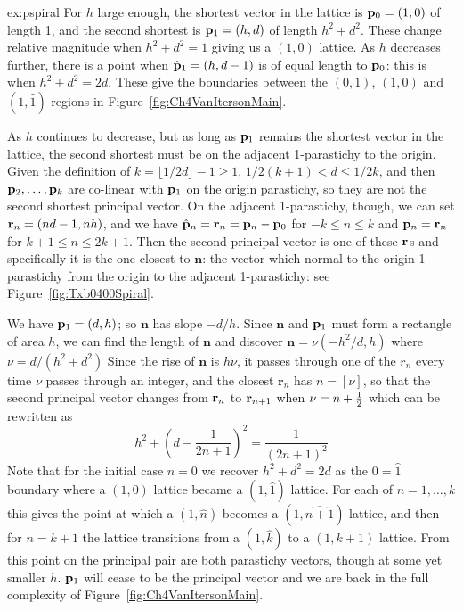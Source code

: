 \begin{jAnswer}{ex:pspiral}
For $h$ large enough, 	the shortest vector in the lattice is  ${\mathbf p}_{0}=(1,0)$ 
of length 1, and the second shortest is  ${\mathbf p}_{1}=(h,d)$ of length $h^2+d^2$.
These change relative magnitude when $h^2+d^2=1$ giving us a $(1,0)$ lattice.
As $h$ decreases further, there is a point when  $\hat{\mathbf p}_{1}=(h,d-1)$ is of equal length to ${\mathbf p}_{0}$: this is when $h^2+d^2=2d$. These give the boundaries between the $(0,1)$, $(1,0)$ and $(1,\hat 1)$ regions in Figure~\ref{fig:Ch4VanItersonMain}. 

As $h$ continues to decrease, but as long as ${\mathbf p}_{1}$ remains the shortest vector in the lattice, the second shortest
must be on the adjacent 1-parastichy to the origin. Given the definition of $k=\lfloor1/2d\rfloor-1\geq 1$, $1/2(k+1)<d\leq 1/2k$,  and then ${\mathbf p}_{2},\ldots,{\mathbf p}_{k}$ are co-linear with ${\mathbf p}_{1}$ on the origin parastichy, so they are not the second shortest principal vector. On the adjacent 1-parastichy, though, we can set $\mathbf{r}_{n}=  (nd-1,n h)$, and we have $\hat{\mathbf p}_{n}=\mathbf{r}_{n}={\mathbf p}_{n}-{\mathbf p}_{0}$ for $-k\leq n\leq k$ and ${\mathbf p}_{n}=\mathbf{r}_{n}$ for $k+1\leq n\leq 2k+1$. Then the second principal vector is one of these $\mathbf{r}_{}$s and specifically it is the one closest to $\mathbf{n}$: the vector which normal to the origin 1-parastichy from the origin to the adjacent 1-parastichy: see Figure~\ref{fig:Txb0400Spiral}.
%

We have ${\mathbf p}_{1}=(d,h)$; so $\mathbf{n}$  has slope $-d/h$. Since   $\mathbf{n}$ and ${\mathbf p}_{1}$
must form a rectangle of area $h$, we can find the length of  $\mathbf{n}$ and discover  $\mathbf{n} = \nu (-h^2 /d,h)$
where 
$
	\nu = 
	{d}/{(h^2+d^2)}
$
Since the rise of $\mathbf{n}$ is $h\nu$, it passes through one of the $r_n$ every time $\nu$ passes through an integer,
and the closest  $\mathbf{r}_n$ has $n=[\nu]$, so that the second principal vector changes from $\mathbf{r}_{n}$ to 
$\mathbf{r}_{n+1}$  when $\nu=n+\textstyle{\frac{1}{2}}$ which can be rewritten as 
\begin{equation}
{h^2+\left(d-\frac{1}{2n+1}\right)^2}=  \frac{1}{(2n+1)^2}
\end{equation}
Note that for the initial case $n=0$ we recover $h^2+d^2=2d$ as the $0=\hat{1}$ boundary where a $(1,0)$ lattice became a $(1,\hat 1)$ lattice. For each of $n=1,\ldots,k$ this gives the point at which a  $(1,\hat n)$ becomes a  $(1,\widehat {n+1})$ lattice, and then for $n=k+1$ the lattice transitions from a  $(1,\hat {k})$ to a $(1, {k+1})$ lattice.  From this point on the principal pair are both parastichy vectors, though at some yet smaller $h$.  ${\mathbf p}_{1}$ will cease to be the principal vector and we are back in the full complexity of Figure~\ref{fig:Ch4VanItersonMain}.


\end{jAnswer}
